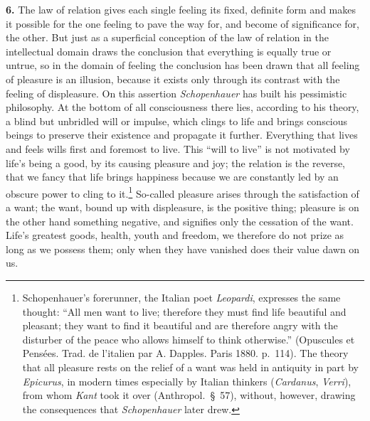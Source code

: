 \documentclass[12pt,a4paper]{book}
\newcommand{\opage}[1]{\marginnote{\footnotesize\textit{[#1]}}}
\begin{document}
\textbf{6.} The law of relation gives each single feeling its fixed,
definite form and makes it possible for the one feeling to pave the way
for, and become of significance for, the other. But just as a
superficial conception of the law of relation in the intellectual domain
draws the conclusion that everything is equally true or untrue, so in
the domain of feeling the conclusion has been drawn that all feeling of
pleasure is an illusion, because it exists only through its contrast
with the feeling of displeasure. On this assertion \emph{Schopenhauer}
has built his pessimistic philosophy. At the bottom of all consciousness
there lies, according to his theory, a blind but unbridled will or
impulse, which clings to life and brings conscious beings to preserve
their existence and propagate it further. Everything that lives and
feels wills first and foremost to live. This ``will to live'' is not
motivated by life's being a good, by its causing pleasure and joy; the
relation is the reverse, that we fancy that life brings happiness
because we are constantly led by an obscure power to cling to
it.\footnote{Schopenhauer's forerunner, the Italian poet
\emph{Leopardi}, expresses the same thought: ``All men want to live;
therefore they must find life beautiful and pleasant; they want to find
it beautiful and are therefore angry with the disturber of the peace who
allows himself to think otherwise.'' (Opuscules et Pensées. Trad. de
l’italien par A. Dapples. Paris 1880. p.~114). The theory that all
pleasure rests on the relief of a want was held in antiquity in part by
\emph{Epicurus}, in modern times especially by Italian thinkers
(\emph{Cardanus}, \emph{Verri}), from whom \emph{Kant} took it over
(Anthropol.\ \S~57), without, however, drawing the consequences that
\emph{Schopenhauer} later drew.} So-called pleasure arises through the
satisfaction of a want; the want, bound up with displeasure, is the
positive thing; pleasure is
\opage{337}on the other hand something negative, and signifies only the
cessation of the want. Life's greatest goods, health, youth and freedom,
we therefore do not prize as long as we possess them; only when they
have vanished does their value dawn on us.
\end{document}
